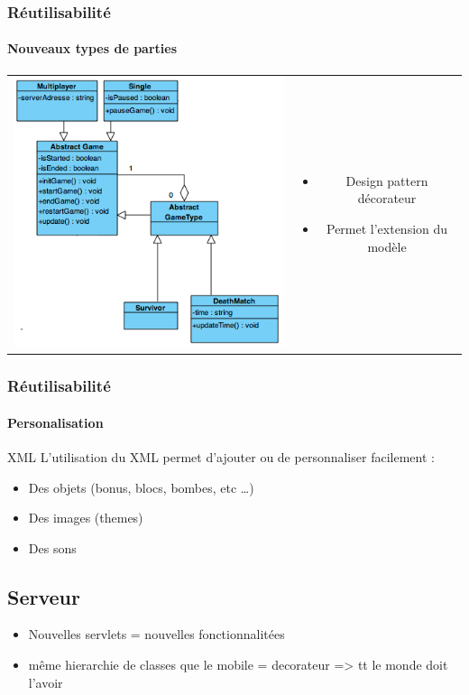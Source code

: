 	\begin{frame}
	\frametitle{Réutilisabilité}
	\framesubtitle{Nouveaux types de parties}

	
	\begin{tabular}{cc}
	\begin{minipage}{5cm}
		\includegraphics[scale=0.4]{img/decorateur.png} 
	\end{minipage}
	&
	\begin{minipage}{5cm}
	\begin{itemize} 
		\item Design pattern décorateur
		\item Permet l'extension du modèle
	\end{itemize} 
	\end{minipage}
	\end{tabular}
	
	\end{frame}
	

	\begin{frame}
	\frametitle{Réutilisabilité}
	\framesubtitle{Personalisation}
	
		XML
			L'utilisation du XML permet d'ajouter ou de personnaliser facilement :
			\begin{itemize}
				\item Des objets (bonus, blocs, bombes, etc \ldots)
				\item Des images (themes)
				\item Des sons
			\end{itemize}
	\end{frame}
	

\subsection{Serveur}

		\begin{itemize}
			\item Nouvelles servlets = nouvelles fonctionnalitées
			\item même hierarchie de classes que le mobile = decorateur => tt le monde doit l'avoir 
		\end{itemize}